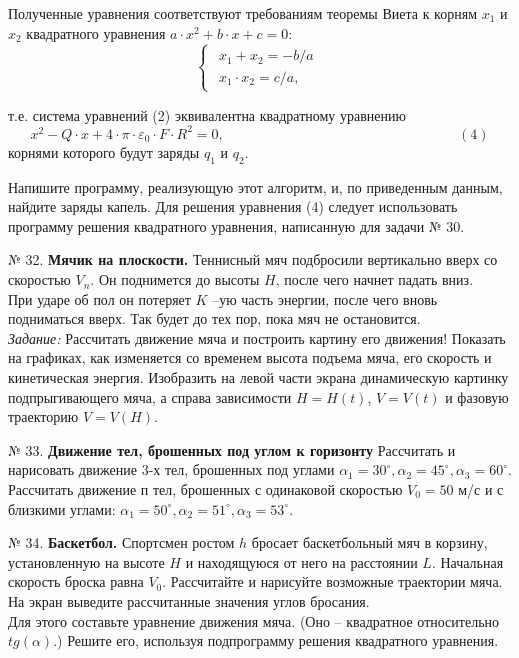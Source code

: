 Полученные уравнения соответствуют требованиям теоремы Виета к корням $x_1$ и $x_2$ квадратного уравнения 
$a\cdot x^2 + b\cdot x +c = 0:$
\begin{equation}
 \begin{cases}
  \begin{aligned}
   x_1 + x_2 = -b/a\\
   x_1\cdot x_2 = c/a, 
      \end{aligned}
 \end{cases}
\end{equation}

т.е. система уравнений (2) эквивалентна квадратному уравнению
$$x^2 - Q\cdot x + 4\cdot\pi\cdot\varepsilon_0\cdot F\cdot R^2 = 0,  \hspace{200pt} (4)$$
    корнями которого будут заряды $q_1$ и $q_2$.
 
Напишите программу, реализующую этот алгоритм, и, по приведенным данным, найдите заряды капель. Для решения уравнения (4) следует использовать программу решения квадратного уравнения, написанную для задачи № 30.

№ 32. {\bf Мячик на плоскости.}
Теннисный мяч подбросили вертикально вверх со скоростью $V_n$. Он поднимется до высоты $H$, после чего начнет падать вниз.\\
При ударе об пол он потеряет $K$ --ую часть энергии, после чего вновь подниматься вверх. Так будет до тех пор, пока мяч не остановится.\\
{\em Задание:} Рассчитать движение мяча и построить картину его движения! Показать на графиках, как изменяется со временем высота подъема мяча, его скорость и кинетическая энергия. Изобразить на левой части экрана динамическую картинку подпрыгивающего мяча, а справа зависимости  $H= H(t)$, $V= V(t)$ и фазовую траекторию $V= V(H)$.

№ 33. {\bf Движение тел, брошенных под углом к горизонту} Рассчитать и нарисовать движение 3-х тел, брошенных под углами $\alpha_1 =30^\circ, \alpha_2 = 45^\circ, \alpha_3 =60^\circ$.  Рассчитать движение $п$ тел, брошенных с одинаковой скоростью   $V_0=50$ м/с  и с близкими углами: $\alpha_1 = 50^\circ, \alpha_2 = 51^\circ, \alpha_3 = 53^\circ$.

№ 34. {\bf Баскетбол.}
Спортсмен ростом $h$ бросает баскетбольный мяч в корзину, установленную на высоте $H$ и находящуюся от него на расстоянии $L$. Начальная скорость броска равна $V_0$. Рассчитайте и нарисуйте возможные траектории мяча. На экран выведите рассчитанные значения углов бросания.\\
Для этого составьте уравнение движения мяча. (Оно -- квадратное относительно $tg(\alpha)$.)  Решите его, используя подпрограмму решения квадратного уравнения.

